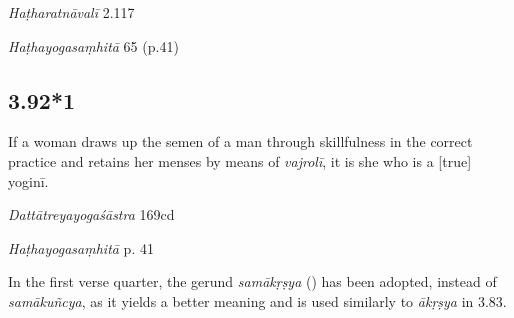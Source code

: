 \begin{ekdosis}
\begin{testimonia}[hp03_092]
\emph{Haṭharatnāvalī} 2.117
\begin{versinnote}
\end{versinnote}

\emph{Haṭhayogasaṃhitā} 65 (p.41)
\begin{versinnote}
\end{versinnote}
\end{testimonia}



\subsection*{3.92*1}
\begin{translation}[hp03_092_1]
If a woman draws up the semen of a man through skillfulness in the correct practice and retains her menses by means of \emph{vajrolī}, it is she who is a [true] yoginī.
\end{translation}

\begin{sources}[hp03_092_1]
\emph{Dattātreyayogaśāstra} 169cd
\begin{versinnote}
\end{versinnote}
\end{sources}

\begin{testimonia}[hp03_092_1]
\emph{Haṭhayogasaṃhitā} p. 41
\begin{versinnote}
\end{versinnote}
\end{testimonia}

\begin{philcomm}[hp03_092_1]
In the first verse quarter, the gerund \emph{samākṛṣya} (\textgamma) has been adopted, instead of \emph{samākuñcya}, as it yields a better meaning and is used similarly to \emph{ākṛṣya} in 3.83.\lb


\end{philcomm}
\end{ekdosis}
